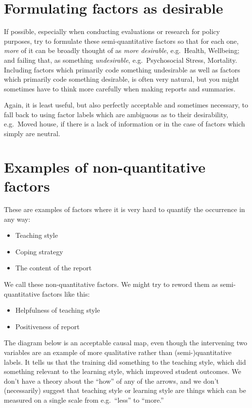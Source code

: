 \documentclass[
]{book}
\providecommand{\tightlist}{%
  \setlength{\itemsep}{0pt}\setlength{\parskip}{0pt}}
\begin{document}
\hypertarget{formulating-factors-as-desirable}{%
\section{Formulating factors as desirable}\label{formulating-factors-as-desirable}}

If possible, especially when conducting evaluations or research for policy purposes, try to formulate these semi-quantitative factors so that for each one, \emph{more} of it can be broadly thought of as \emph{more desirable}, e.g.~Health, Wellbeing; and failing that, as something \emph{undesirable}, e.g.~Psychosocial Stress, Mortality. Including factors which primarily code something undesirable as well as factors which primarily code something desirable, is often very natural, but you might sometimes have to think more carefully when making reports and summaries.

Again, it is least useful, but also perfectly acceptable and sometimes necessary, to fall back to using factor labels which are ambiguous as to their desirability, e.g.~Moved house\emph{,} if there is a lack of information or in the case of factors which simply are neutral.

\hypertarget{examples-of-non-quantitative-factors}{%
\section{Examples of non-quantitative factors}\label{examples-of-non-quantitative-factors}}

These are examples of factors where it is very hard to quantify the occurrence in any way:

\begin{itemize}
\tightlist
\item
  Teaching style
\item
  Coping strategy
\item
  The content of the report
\end{itemize}

We call these non-quantitative factors. We might try to reword them as semi-quantitative factors like this:

\begin{itemize}
\tightlist
\item
  Helpfulness of teaching style
\item
  Positiveness of report
\end{itemize}

The diagram below is an acceptable causal map, even though the intervening two variables are an example of more qualitative rather than (semi-)quantitative labels. It tells us that the training did something to the teaching style, which did something relevant to the learning style, which improved student outcomes. We don't have a theory about the ``how'' of any of the arrows, and we don't (necessarily) suggest that teaching style or learning style are things which can be measured on a single scale from e.g.~``less'' to ``more.''
\end{document}
